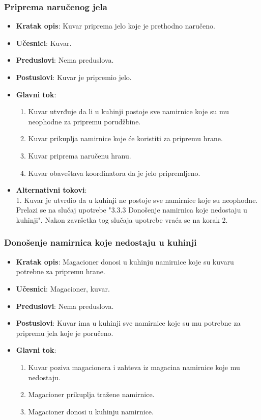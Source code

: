 \subsubsection{Priprema naručenog jela}
\begin{itemize}
    \item \textbf{Kratak opis}:
    Kuvar priprema jelo koje je prethodno naručeno.
    \item \textbf{Učesnici}:
    Kuvar.
    \item \textbf{Preduslovi}:
    Nema preduslova.
    \item \textbf{Postuslovi}:
    Kuvar je pripremio jelo.
    \item \textbf{Glavni tok}:
   \begin{enumerate}
        \item Kuvar utvrđuje da li u kuhinji postoje sve namirnice koje
        su mu neophodne za pripremu porudžbine.
        \item Kuvar prikuplja namirnice koje će koristiti za pripremu hrane.
        \item Kuvar priprema naručenu hranu.
        \item Kuvar obaveštava koordinatora da je
        jelo pripremljeno.
\end{enumerate}
 \item \textbf{Alternativni tokovi}:\\
     1. Kuvar je utvrdio da u kuhinji ne postoje
     sve namirnice koje su neophodne.
     \\ Prelazi se na slučaj
    upotrebe "3.3.3 Donošenje namirnica koje nedostaju u kuhinji". Nakon završetka tog slučaja upotrebe
    vraća se na korak 2. 
\end{itemize}

\subsubsection{Donošenje namirnica koje nedostaju u kuhinji}
\begin{itemize}
    \item \textbf{Kratak opis}:
    Magacioner donosi u kuhinju namirnice koje su kuvaru potrebne za pripremu hrane.
    \item \textbf{Učesnici}:
    Magacioner, kuvar.
    \item \textbf{Preduslovi}:
    Nema preduslova.
    \item \textbf{Postuslovi}:
    Kuvar ima u kuhinji sve namirnice koje su mu potrebne za pripremu jela koje je poručeno.
    \item \textbf{Glavni tok}:
   \begin{enumerate}
        \item Kuvar poziva magacionera i zahteva iz magacina namirnice koje mu nedostaju.
        \item Magacioner prikuplja tražene namirnice.
        \item Magacioner donosi u kuhinju namirnice.
\end{enumerate}
\end{itemize}

